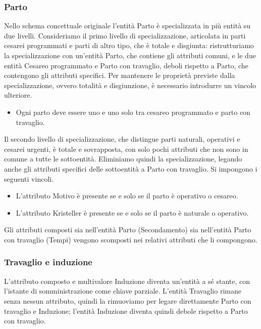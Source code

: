 \subsubsection{Parto}

Nello schema concettuale originale l'entità Parto è specializzata in più entità su due livelli.
Consideriamo il primo livello di specializzazione, articolata in parti cesarei programmati e parti di altro tipo, che è totale e disgiunta: ristrutturiamo la specializzazione con un'entità Parto, che contiene gli attributi comuni, e le due entità Cesareo programmato e Parto con travaglio, deboli rispetto a Parto, che contengono gli attributi specifici.
Per mantenere le proprietà previste dalla specializzazione, ovvero totalità e disgiunzione, è necessario introdurre un vincolo ulteriore.
\begin{itemize}
\item[\Con{}]  Ogni parto deve essere uno e uno solo tra cesareo programmato e parto con travaglio.
\end{itemize}

Il secondo livello di specializzazione, che distingue parti naturali, operativi e cesarei urgenti, è totale e sovrapposta, con solo pochi attributi che non sono in comune a tutte le sottoentità.
Eliminiamo quindi la specializzazione, legando anche gli attributi specifici delle sottoentità a Parto con travaglio.
Si impongono i seguenti vincoli.
\begin{itemize}
\item[\Con{}] L'attributo Motivo è presente se e solo se il parto è operativo o cesareo.
\item[\Con{}] L'attributo Kristeller è presente se e solo se il parto è naturale o operativo.
\end{itemize}

Gli attributi composti sia nell'entità Parto (Secondamento) sia nell'entità Parto con travaglio (Tempi) vengono scomposti nei relativi attributi che li compongono.

\subsubsection{Travaglio e induzione}

L'attributo composto e multivalore Induzione diventa un'entità a sé stante, con l'istante di somministrazione come chiave parziale.
L'entità Travaglio rimane senza nessun attributo, quindi la rimuoviamo per legare direttamente Parto con travaglio e Induzione; l'entità Induzione diventa quindi debole rispetto a Parto con travaglio.

